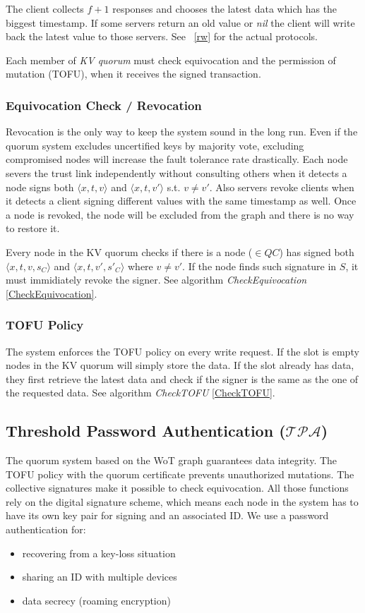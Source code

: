 The client collects $f + 1$ responses and chooses the latest data which
has the biggest timestamp. If some servers return an old value or {\em
  nil} the client will write back the latest value to those servers.
\ifdefined\ABSTRACT
\else
See ~\ref{rw} for the actual protocols.
\fi

Each member of {\em KV quorum} must check equivocation and the
permission of mutation (TOFU), when it receives the signed
transaction.

\subsubsection*{Equivocation Check / Revocation}
Revocation is the only way to keep the system sound in the long
run. Even if the quorum system excludes uncertified keys by majority
vote, excluding compromised nodes will increase the fault tolerance
rate drastically.
Each node severs the trust link independently without consulting
others when it detects a node signs both $\langle x,t,v \rangle$ and
$\langle x,t,v' \rangle$ s.t.  $v \neq v'$. Also servers revoke
clients when it detects a client signing different values with the
same timestamp as well. Once a node is revoked, the node will be
excluded from the graph and there is no way to restore it.

Every node in the KV quorum checks if there is a node ($\in QC$) has
signed both $\langle x, t, v, s_C \rangle$ and $\langle x, t, v', s'_C
\rangle$ where $v \neq v'$.
If the node finds such signature in $S$, it must immidiately revoke
the signer.
See algorithm {\em CheckEquivocation} \ref {CheckEquivocation}.

\subsubsection*{TOFU Policy}
The system enforces the TOFU policy on every write request. If the
slot is empty nodes in the KV quorum will simply store the data. If
the slot already has data, they first retrieve the latest data and
check if the signer is the same as the one of the requested data.
See algorithm {\em CheckTOFU} \ref{CheckTOFU}.

\subsection{Threshold Password Authentication ($\mathcal{TPA}$)}
\label{threshold}
The quorum system based on the WoT graph guarantees data
integrity. The TOFU policy with the quorum certificate prevents
unauthorized mutations. The collective signatures make it possible to
check equivocation. All those functions rely on the digital signature
scheme, which means each node in the system has to have its own key
pair for signing and an associated ID. We use a password
authentication for:
\begin{itemize}
\item recovering from a key-loss situation
\item sharing an ID with multiple devices
\item data secrecy (roaming encryption)
\end{itemize}

